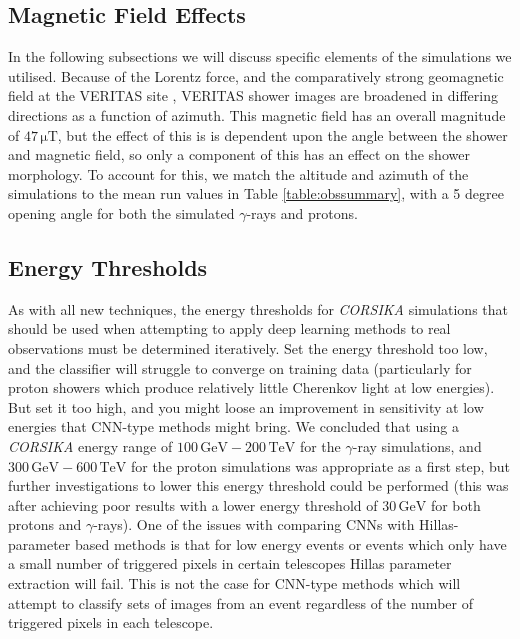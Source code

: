 \subsection{Magnetic Field Effects}
In the following subsections we will discuss specific elements of the simulations we utilised. Because of the Lorentz force, and the comparatively strong geomagnetic field at the VERITAS site \cite{kraus}, VERITAS shower images are broadened in differing directions as a function of azimuth. This magnetic field has an overall magnitude of $\mathrm{47\,\mu T}$, but the effect of this is is dependent upon the angle between the shower and magnetic field, so only a component of this has an effect on the shower morphology.  To account for this, we match the altitude and azimuth of the simulations to the mean run values in Table \ref{table:obssummary}, with a 5 degree opening angle for both the simulated $\gamma$-rays and protons.

\subsection{Energy Thresholds}
As with all new techniques, the energy thresholds for \textit{CORSIKA} simulations that should be used when attempting to apply deep learning methods to real observations must be determined iteratively. Set the energy threshold too low, and the classifier will struggle to converge on training data (particularly for proton showers which produce relatively little Cherenkov light at low energies). But set it too high, and you might loose an improvement in sensitivity at low energies that CNN-type methods might bring. We concluded that using a \textit{CORSIKA} energy range of $\mathrm{100\,GeV-200\,TeV}$ for the $\gamma$-ray simulations, and $\mathrm{300\,GeV-600\,TeV}$ for the proton simulations was appropriate as a first step, but further investigations to lower this energy threshold could be performed (this was after achieving poor results with a lower energy threshold of $\mathrm{30\,GeV}$ for both protons and $\gamma$-rays). One of the issues with comparing CNNs with Hillas-parameter based methods is that for low energy events or events which only have a small number of triggered pixels in certain telescopes Hillas parameter extraction will fail. This is not the case for CNN-type methods which will attempt to classify sets of images from an event regardless of the number of triggered pixels in each telescope.

